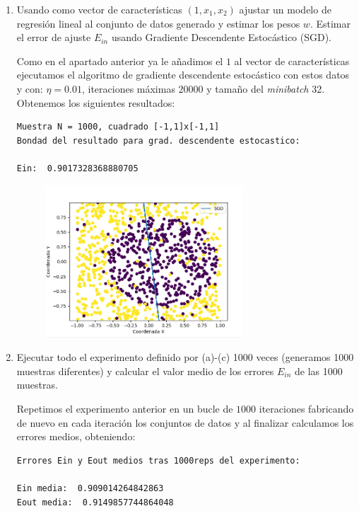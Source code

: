 \documentclass[size=a4, parskip=half, titlepage=false, toc=flat, toc=bib, 12pt]{scrartcl}
\begin{document}
\begin{enumerate}
\begin{enumerate}
\item Usando como vector de características $(1, x_1 , x_2 )$ ajustar un modelo de regresión
lineal al conjunto de datos generado y estimar los pesos $w$. Estimar el error de
ajuste $E_{in}$ usando Gradiente Descendente Estocástico (SGD).

Como en el apartado anterior ya le añadimos el $1$ al vector de características ejecutamos
el algoritmo de gradiente descendente estocástico con estos datos y con: $\eta = 0.01$, iteraciones
máximas $20000$ y tamaño del \textit{minibatch} 32. Obtenemos los siguientes resultados:

\begin{lstlisting}
Muestra N = 1000, cuadrado [-1,1]x[-1,1]
Bondad del resultado para grad. descendente estocastico:

Ein:  0.9017328368880705
\end{lstlisting}
\begin{figure}[H]
\centering
\includegraphics[width=0.7\textwidth]{./img/ej25}
\end{figure}

\item Ejecutar todo el experimento definido por (a)-(c) 1000 veces (generamos 1000
muestras diferentes) y calcular el valor medio de los errores $E_{in}$ de las 1000 muestras.

Repetimos el experimento anterior en un bucle de $1000$ iteraciones fabricando de nuevo en cada
iteración los conjuntos de datos y al finalizar calculamos los errores medios, obteniendo:

\begin{lstlisting}
Errores Ein y Eout medios tras 1000reps del experimento:

Ein media:  0.909014264842863
Eout media:  0.9149857744864048
\end{lstlisting}


\end{enumerate}
\end{enumerate}
\end{document}
